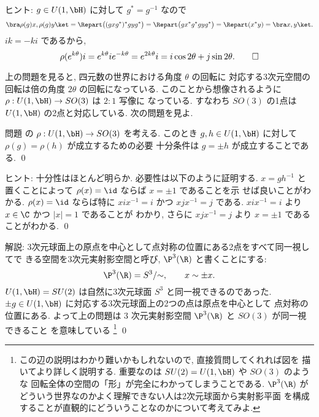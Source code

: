 \documentclass[12pt,twoside]{jarticle}
\begin{document}
\noindent
ヒント: $g\in U(1,\bH)$ に対して $g^*=g^{-1}$ なので
\begin{equation*}
  \bra \rho(g)x,\rho(g)y\ket 
  = \Repart\bigl((gxg^*)^*gyg^*\bigr)
  = \Repart\bigl(gx^*g^*gyg^*\bigr)
  = \Repart(x^*y)
  = \bra x,y\ket.
\end{equation*}
$ik=-ki$ であるから,
\begin{equation*}
  \rho(e^{k\theta})i
  = e^{k\theta}i e^{-k\theta}
  = e^{2k\theta}i
  = i\cos2\theta + j\sin2\theta.
\qed
\end{equation*}

\medskip

上の問題を見ると, 四元数の世界における角度 $\theta$ の回転に
対応する3次元空間の回転は倍の角度 $2\theta$ の回転になっている.
このことから想像されるように $\rho:U(1,\bH)\to SO(3)$ は $2:1$ 写像に
なっている.  すなわち $SO(3)$ の1点は $U(1,\bH)$ の2点と対応している.
次の問題を見よ.

\begin{question}
  問題  の $\rho:U(1,\bH)\to SO(3)$ を考える.
  このとき $g,h\in U(1,\bH)$ に対して $\rho(g)=\rho(h)$ が成立するための必要
  十分条件は $g=\pm h$ が成立することである. 
  \qed
\end{question}

\noindent
ヒント: 十分性はほとんど明らか. 必要性は以下のように証明する.
$x = gh^{-1}$ と置くことによって $\rho(x)=\id$ ならば $x=\pm 1$ であることを示
せば良いことがわかる.  $\rho(x)=\id$ ならば特に $xix^{-1}=i$ かつ $xjx^{-1}=j$ 
である. $xix^{-1}=i$ より $x\in\C$ かつ $|x|=1$ であることが
わかり, さらに $xjx^{-1}=j$ より $x=\pm1$ であることがわかる.
\qed

\medskip
\noindent
解説: 3次元球面上の原点を中心として点対称の位置にある2点をすべて同一視してで
きる空間を3次元実射影空間と呼び, $\P^3(\R)$ と書くことにする:
\begin{equation*}
  \P^3(\R) = S^3/{\sim}, \qquad  x \sim \pm x.
\end{equation*}
$U(1,\bH)=SU(2)$ は自然に3次元球面 $S^3$ と同一視できるのであった.
$\pm g\in U(1,\bH)$ に対応する3次元球面上の2つの点は原点を中心として
点対称の位置にある.  
よって上の問題は $3$ 次元実射影空間 $\P^3(\R)$ と $SO(3)$ が同一視できること
を意味している%
\footnote{この辺の説明はわかり難いかもしれないので, 直接質問してくれれば図を
  描いてより詳しく説明する.  重要なのは $SU(2)=U(1,\bH)$ や $SO(3)$ のような
  回転全体の空間の「形」が完全にわかってしまうことである.
  $\P^3(\R)$ がどういう世界なのかよく理解できない人は2次元球面から実射影平面
  を構成することが直観的にどういうことなのかについて考えてみよ.}
\qed
\end{document}
